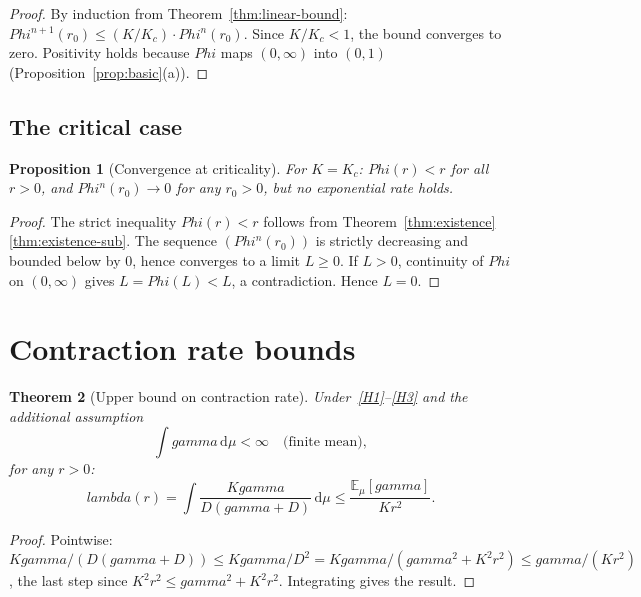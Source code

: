 \documentclass[11pt,a4paper]{article}
\makeatletter
\let\Phi\relax\def\Phi{Phi}%
\let\lambda\relax\def\lambda{lambda}%
\let\gamma\relax\def\gamma{gamma}%
\let\texorpdfstring\@secondoftwo}
\newtheorem{theorem}{Theorem}[section]
\newtheorem{proposition}[theorem]{Proposition}
\theoremstyle{definition}
\makeatother
\begin{document}
\begin{proof}
By induction from Theorem~\ref{thm:linear-bound}: $\Phi^{n+1}(r_0) \leq (K/K_c) \cdot \Phi^n(r_0)$. Since $K/K_c < 1$, the bound converges to zero. Positivity holds because $\Phi$ maps $(0,\infty)$ into $(0,1)$ (Proposition~\ref{prop:basic}(a)).
\end{proof}

\subsection{The critical case \texorpdfstring{$K = K_c$}{K = Kc}}

\begin{proposition}[Convergence at criticality]\label{prop:critical}
For $K = K_c$: $\Phi(r) < r$ for all $r > 0$, and $\Phi^n(r_0) \to 0$ for any $r_0 > 0$, but no exponential rate holds.
\end{proposition}

\begin{proof}
The strict inequality $\Phi(r) < r$ follows from Theorem~\ref{thm:existence}\ref{thm:existence-sub}. The sequence $(\Phi^n(r_0))$ is strictly decreasing and bounded below by $0$, hence converges to a limit $L \geq 0$. If $L > 0$, continuity of $\Phi$ on $(0,\infty)$ gives $L = \Phi(L) < L$, a contradiction. Hence $L = 0$.
\end{proof}

\section{Contraction rate bounds}\label{sec:rate-bounds}

\begin{theorem}[Upper bound on contraction rate]\label{thm:rate-upper}
Under~\ref{H1}--\ref{H3} and the additional assumption
\begin{equation}\label{eq:finite-mean}\tag{H5}
\int \gamma\,\mathrm{d}\mu < \infty \quad \text{(finite mean)},
\end{equation}
for any $r > 0$:
\[
\lambda(r) = \int \frac{K\gamma}{D(\gamma + D)}\,\mathrm{d}\mu \leq \frac{\mathbb{E}_\mu[\gamma]}{K r^2}.
\]
\end{theorem}

\begin{proof}
Pointwise: $K\gamma/(D(\gamma+D)) \leq K\gamma/D^2 = K\gamma/(\gamma^2 + K^2 r^2) \leq \gamma/(Kr^2)$, the last step since $K^2 r^2 \leq \gamma^2 + K^2 r^2$. Integrating gives the result.
\end{proof}
\end{document}
